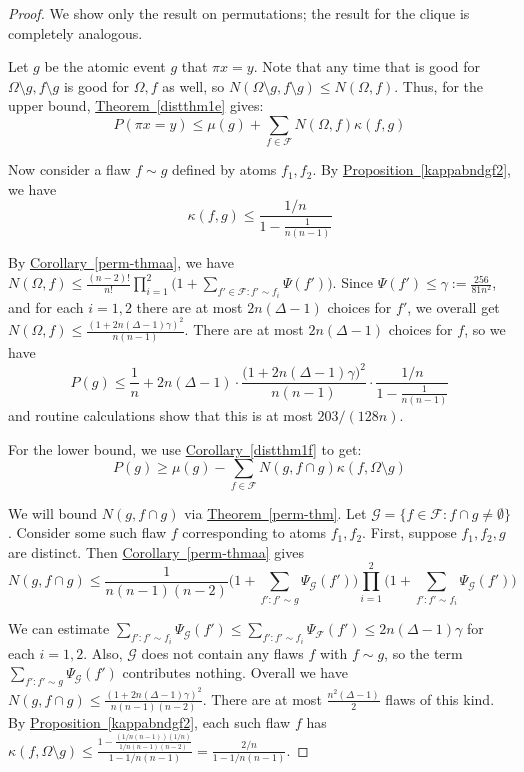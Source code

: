\documentclass[11pt]{article}
\newcommand{\expref}[2]{\texorpdfstring{\hyperref[#2]{#1~\ref{#2}}}{#1~\ref{#2}}}
\begin{document}
\begin{proof}
  We show only the result on permutations; the result for the clique is completely analogous. 
  
  
Let $g$ be the atomic event $g$ that $\pi x = y$.   Note that any time that is good for $\Omega \setminus g, f \setminus g$ is good for $\Omega, f$ as well, so $N( \Omega \setminus g, f \setminus g) \leq N(\Omega,  f)$. Thus, for the upper bound, \expref{Theorem}{distthm1e} gives:
  $$
  P( \pi x = y) \leq \mu(g) + \sum_{f \in \mathcal F} N(\Omega, f) \kappa(f, g)
  $$
  
  Now consider a flaw $f \sim g$ defined by atoms $f_1, f_2$. By \expref{Proposition}{kappabndgf2}, we have
  $$
  \kappa(f,g) \leq \frac{1/n}{1 - \frac{1}{n(n-1)}}
   $$
  
  By  \expref{Corollary}{perm-thmaa}, we have $N( \Omega, f) \leq \frac{ (n-2)! }{n!} \prod_{i=1}^2 \bigl(1 + \sum_{f' \in \mathcal F: f' \sim f_i} \Psi(f') \bigr)$. Since $\Psi(f') \leq \gamma := \frac{256}{81 n^2}$, and for each $i = 1,2$ there are at most $2 n (\Delta-1)$ choices for $f'$, we overall get $ N(\Omega, f) \leq \frac{ ( 1 + 2 n (\Delta-1) \gamma)^2}{n(n-1)}$. There are at most $2 n (\Delta - 1)$ choices for $f$, so we have
 $$
  P(g) \leq \frac{1}{n}  + 2 n (\Delta-1) \cdot \frac{( 1 + 2 n (\Delta-1) \gamma \bigr)^2}{n(n-1)} \cdot \frac{ 1/n}{1 - \frac{1}{n(n-1)}}
  $$
  and routine calculations show that this is at most $203/(128 n)$.

For the lower bound, we use \expref{Corollary}{distthm1f} to get:
$$
P(g) \geq \mu(g) - \sum_{f \in \mathcal F} N( g, f \cap g)  \kappa(f, \Omega \setminus g)
  $$
  
We will bound $N( g, f \cap g)$ via \expref{Theorem}{perm-thm}. Let  $\mathcal G = \{f \in \mathcal F: f \cap g \neq \emptyset \}$. Consider some such flaw $f$ corresponding to atoms $f_1, f_2$. First, suppose $f_1, f_2, g$ are distinct.  Then   \expref{Corollary}{perm-thmaa} gives $$
N(  g, f \cap g) \leq \frac{1}{n(n-1)(n-2)}  \bigl( 1 + \sum_{f': f' \sim g} \Psi_{\mathcal G}(f') \bigr) \prod_{i=1}^2 \bigl(1 + \sum_{f': f' \sim f_i} \Psi_{\mathcal G}(f') \bigr)
$$

We can estimate $ \sum_{f': f' \sim f_i} \Psi_{\mathcal G}(f') \leq \sum_{f': f' \sim f_i} \Psi_{\mathcal F}(f')  \leq 2 n (\Delta - 1) \gamma$ for each $i = 1,2$. Also, $\mathcal G$ does not contain any flaws $f$ with $f \sim g$, so the term $\sum_{f': f' \sim g} \Psi_{\mathcal G}(f')$ contributes nothing. Overall we have $N(  g, f \cap g) \leq \frac{ (1 + 2 n (\Delta - 1) \gamma)^2}{n(n-1)(n-2)}$.  There are at most $\frac{n^2 (\Delta-1)}{2}$ flaws of this kind. By \expref{Proposition}{kappabndgf2}, each such flaw $f$ has $\kappa(f, \Omega \setminus g) \leq \frac{1 - \frac{(1/n(n-1)) (1/n)}{1/n(n-1)(n-2)}}{1 - 1/n(n-1)} = \frac{2/n}{1-1/n(n-1)}$. 



\end{proof}
\end{document}
